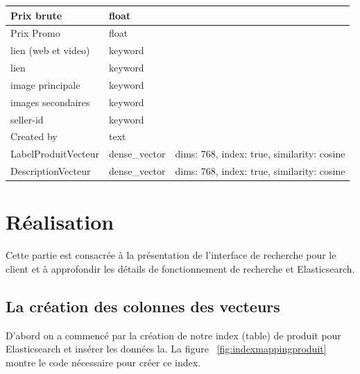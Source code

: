 \begin{longtable}{|l|l|p{5cm}|}
	Prix brute                                   & float                   &                                            \\ \hline
	Prix Promo                                   & float                   &                                            \\ \hline
	lien (web et video)                          & keyword                 &                                            \\ \hline
	lien                                         & keyword                 &                                            \\ \hline
	image principale                             & keyword                 &                                            \\ \hline
	images secondaires                           & keyword                 &                                            \\ \hline
	seller-id                                    & keyword                 &                                            \\ \hline
	Created by                                   & text                    &                                            \\ \hline
	LabelProduitVecteur                          & dense\_vector           & dims: 768, index: true, similarity: cosine \\ \hline
	DescriptionVecteur                           & dense\_vector           & dims: 768, index: true, similarity: cosine \\
	\hline
\end{longtable}

\section{Réalisation}
\noindent
Cette partie est consacrée à la présentation de l'interface de recherche pour le client et à approfondir les détails de fonctionnement de recherche et Elasticsearch.

\subsection{La création des colonnes des vecteurs}
\noindent
D'abord on a commencé par la création de notre index (table) de produit pour Elasticsearch et insérer les données la. La figure ~\ref{fig:indexmappingproduit} montre le code nécessaire pour créer ce index.

